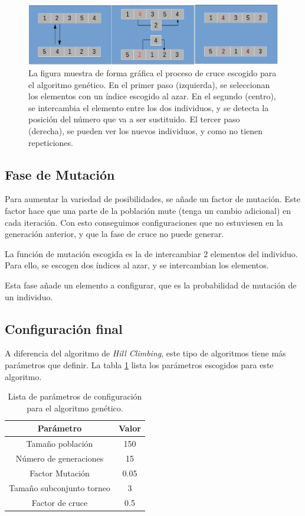 \documentclass[10pt,a4paper]{article}
\begin{document}
\begin{figure}[h]
\includegraphics[scale=0.45]{gaCrossover.png} 
\caption{La figura muestra de forma gráfica el proceso de cruce escogido para el algoritmo genético. En el primer paso (izquierda), se seleccionan los elementos con un índice escogido al azar. En el segundo (centro), se intercambia el elemento entre los dos individuos, y se detecta la posición del número que va a ser sustituido. El tercer paso (derecha), se pueden ver los nuevos individuos, y como no tienen repeticiones.}
\label{fig:gaCrossover}
\end{figure}

\subsection{Fase de Mutación}
Para aumentar la variedad de posibilidades, se añade un factor de mutación. Este factor hace que una parte de la población mute (tenga un cambio adicional) en cada iteración. Con esto conseguimos configuraciones que no estuviesen en la generación anterior, y que la fase de cruce no puede generar.

La función de mutación escogida es la de intercambiar 2 elementos del individuo. Para ello, se escogen dos índices al azar, y se intercambian los elementos.

Esta fase añade un elemento a configurar, que es la probabilidad de mutación de un individuo.

\subsection{Configuración final}
A diferencia del algoritmo de \textit{Hill Climbing}, este tipo de algoritmos tiene más parámetros que definir. La tabla \ref{tab:gaParameters} lista los parámetros escogidos para este algoritmo.

\begin{table}
\begin{center}
\begin{tabular}{|c||c|}
\hline
Parámetro & Valor \\
\hline \hline
Tamaño población & 150 \\
\hline
Número de generaciones & 15 \\
\hline
Factor Mutación & 0.05\\
\hline
Tamaño subconjunto torneo & 3\\
\hline
Factor de cruce & 0.5 \\
\hline
\end{tabular}
\end{center}
\caption{Lista de parámetros de configuración para el algoritmo genético.}
\label{tab:gaParameters}
\end{table}
\end{document}

